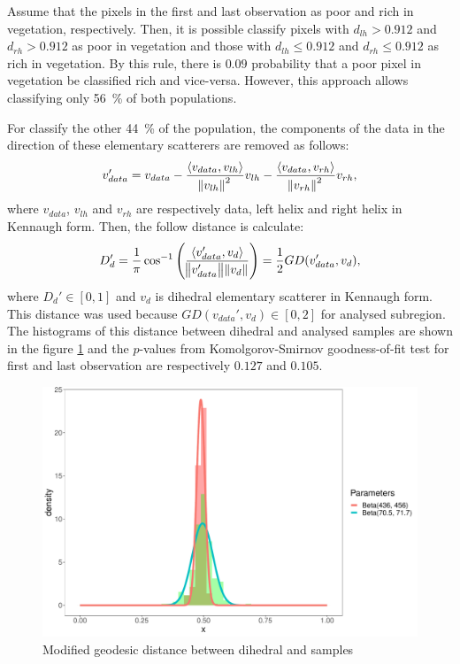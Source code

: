 \documentclass[12pt]{article}
\begin{document}
Assume that the pixels in the first and last observation as poor and rich in vegetation, respectively.
Then, it is possible classify pixels with $d_{lh} > 0.912$ and $d_{rh} > 0.912$ as poor in vegetation and those with $d_{lh} \le 0.912$ and $d_{rh} \le 0.912$ as rich in vegetation.
By this rule, there is $0.09$ probability that a poor pixel in vegetation be classified rich and vice-versa.
However, this approach allows classifying only \SI{56}{\percent} of both populations.

For classify the other \SI{44}{\percent} of the population, the components of the data in the direction of these elementary scatterers are removed as follows:
\begin{equation}
  v_{data}' =  v_{data} - \frac{\langle v_{data}, v_{lh} \rangle}{\norm{v_{lh}}^2} v_{lh} - \frac{\langle v_{data}, v_{rh} \rangle}{\norm{v_{rh}}^2} v_{rh},
\end{equation}
where $v_{data}$, $v_{lh}$ and $v_{rh}$ are respectively data, left helix and right helix in Kennaugh form. Then, the follow distance is calculate:
\begin{equation}
  D_{d}' = \frac{1}{\pi} \cos^{-1}\left(\frac{\langle v_{data}', v_d \rangle}{\norm{v_{data}'}\norm{v_d}}\right) = \frac{1}{2}GD(v_{data}', v_d),
\end{equation}
where $D_d' \in [0, 1]$ and $v_d$ is dihedral elementary scatterer in Kennaugh form. This distance was used because $GD(v_{data}', v_d) \in [0, 2]$ for analysed subregion. The histograms of this distance between dihedral and analysed samples are shown in the figure \ref{fig:hist_di} and the $p$-values from Komolgorov-Smirnov goodness-of-fit test for first and last observation are respectively $0.127$ and $0.105$.
\begin{figure}[hbt]
  \centering
  \includegraphics[width = .5\linewidth]{Histograms/hist_mod_di}
  \caption{Modified geodesic distance between dihedral and samples}
  \label{fig:hist_di}
\end{figure}
\end{document}
